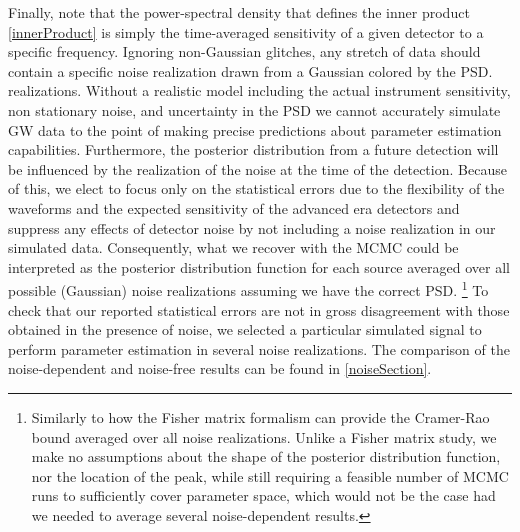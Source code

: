 \documentclass[11pt,a4paper]{emulateapj}
\begin{document}
Finally, note that the power-spectral density that defines the inner product \eqref{innerProduct} is simply 
the time-averaged sensitivity of a given detector to a specific frequency.  Ignoring non-Gaussian glitches,
 any stretch of data should contain a specific noise realization drawn from a Gaussian colored by the PSD.
     realizations. Without a realistic model including the actual instrument sensitivity,
      non stationary noise, and uncertainty in the PSD we cannot 
     accurately simulate GW data to the point of making precise predictions about parameter 
     estimation capabilities.  Furthermore, the posterior distribution from a future 
     detection will be influenced by 
     the realization of the noise at the time of the detection.  Because of this, we 
     elect to focus only on the statistical 
     errors due to the flexibility of the waveforms and the expected sensitivity of 
     the advanced era detectors and suppress 
     any effects of detector noise by not including a noise realization in our simulated data.
       Consequently, what we recover with the MCMC  
     could be interpreted as the posterior distribution function for each source averaged over all
      possible (Gaussian) noise realizations 
     assuming we have the correct PSD.    \footnote{Similarly to how the Fisher matrix formalism can
      provide the Cramer-Rao bound averaged over
     all noise realizations.  Unlike a Fisher matrix study, we make no assumptions about the 
     shape of the posterior distribution function, nor the location of the peak, while still requiring a
      feasible number of MCMC runs 
     to sufficiently cover parameter space, which would not be the case had we needed to 
     average several noise-dependent results.} To check that our reported statistical errors
     are not in gross disagreement with those obtained in the presence of noise,  we selected a 
       particular simulated signal to perform parameter estimation in several noise realizations.  
       The comparison of the noise-dependent and noise-free results
       can be found in \ref{noiseSection}.
\end{document}
